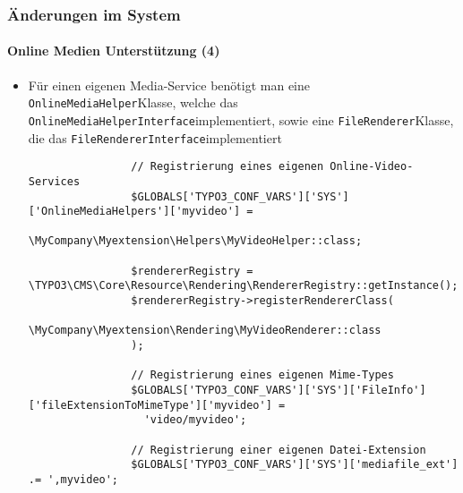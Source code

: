 \begin{frame}[fragile]
	\frametitle{Änderungen im System}
	\framesubtitle{Online Medien Unterstützung (4)}

	\lstset{basicstyle=\tiny\ttfamily}

	\begin{itemize}

		\item Für einen eigenen Media-Service benötigt man eine
			\small\texttt{OnlineMediaHelper}\normalsize\space Klasse, welche das
			\small\texttt{OnlineMediaHelperInterface}\normalsize\space implementiert, sowie eine
			\small\texttt{FileRenderer}\normalsize\space Klasse, die das
			\small\texttt{FileRendererInterface}\normalsize\space implementiert

			\begin{lstlisting}
				// Registrierung eines eigenen Online-Video-Services
				$GLOBALS['TYPO3_CONF_VARS']['SYS']['OnlineMediaHelpers']['myvideo'] =
				  \MyCompany\Myextension\Helpers\MyVideoHelper::class;

				$rendererRegistry = \TYPO3\CMS\Core\Resource\Rendering\RendererRegistry::getInstance();
				$rendererRegistry->registerRendererClass(
				  \MyCompany\Myextension\Rendering\MyVideoRenderer::class
				);

				// Registrierung eines eigenen Mime-Types
				$GLOBALS['TYPO3_CONF_VARS']['SYS']['FileInfo']['fileExtensionToMimeType']['myvideo'] =
				  'video/myvideo';

				// Registrierung einer eigenen Datei-Extension
				$GLOBALS['TYPO3_CONF_VARS']['SYS']['mediafile_ext'] .= ',myvideo';
			\end{lstlisting}

	\end{itemize}

\end{frame}


